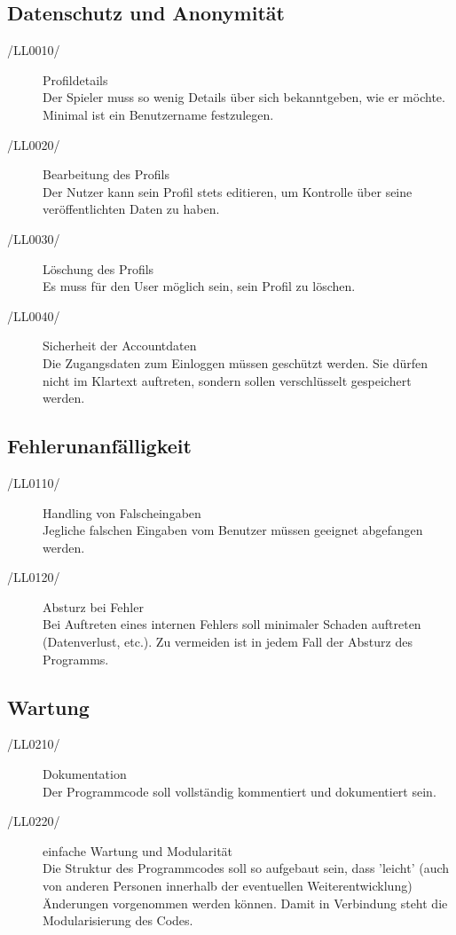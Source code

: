 \documentclass[11pt,a4paper]{scrreprt}
\begin{document}
\subsection{Datenschutz und Anonymität}
\begin{description}
\item[/LL0010/] Profildetails \\
Der Spieler muss so wenig Details über sich bekanntgeben, wie er möchte. Minimal ist ein Benutzername festzulegen.

\item[/LL0020/] Bearbeitung des Profils \\ 
Der Nutzer kann sein Profil stets editieren, um Kontrolle über seine veröffentlichten Daten zu haben.

\item[/LL0030/] Löschung des Profils \\ 
Es muss für den User möglich sein, sein Profil zu löschen.

\item[/LL0040/] Sicherheit der Accountdaten \ \\
Die Zugangsdaten zum Einloggen müssen geschützt werden. Sie dürfen nicht im Klartext auftreten, sondern sollen verschlüsselt gespeichert werden.
\end{description}

\subsection{Fehlerunanfälligkeit}
\begin{description}
\item[/LL0110/] Handling von Falscheingaben \ \\
Jegliche falschen Eingaben vom Benutzer müssen geeignet abgefangen werden.

\item[/LL0120/] Absturz bei Fehler \ \\
Bei Auftreten eines internen Fehlers soll minimaler Schaden auftreten (Datenverlust, etc.). Zu vermeiden ist in jedem Fall der Absturz des Programms.
\end{description}
\subsection{Wartung}
\begin{description}
\item[/LL0210/] Dokumentation \ \\
Der Programmcode soll vollständig kommentiert und dokumentiert sein.

\item[/LL0220/] einfache Wartung und Modularität \ \\
Die Struktur des Programmcodes soll so aufgebaut sein, dass 'leicht' (auch von anderen Personen innerhalb der eventuellen Weiterentwicklung) Änderungen vorgenommen werden können. Damit in Verbindung steht die Modularisierung des Codes.
\end{description}
\end{document}
